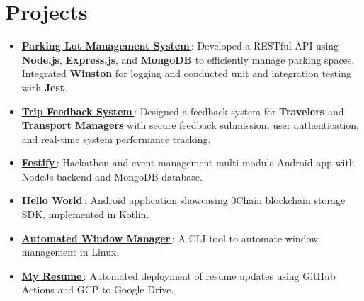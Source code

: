 \documentclass[letterpaper,1pt]{article}
\let\orighref\href
\renewcommand{\href}[2]{\orighref{#1}{#2\,\faExternalLink}}
\begin{document}
\section{Projects}
\begin{itemize}[leftmargin=*, itemsep=1pt, parsep=0pt]

  \item \href{https://github.com/yash10019coder/ParkingLotBackend}{\textbf{Parking Lot Management System}}: Developed a RESTful API using \textbf{Node.js}, \textbf{Express.js}, and \textbf{MongoDB} to efficiently manage parking spaces. Integrated \textbf{Winston} for logging and conducted unit and integration testing with \textbf{Jest}.
  \item \href{https://github.com/yash10019coder/TravelSpringBoot}{\textbf{Trip Feedback System}}: Designed a feedback system for \textbf{Travelers} and \textbf{Transport Managers} with secure feedback submission, user authentication, and real-time system performance tracking.
  \item \href{https://github.com/yash10019coder/festify-android}{\textbf{Festify}}: Hackathon and event management multi-module Android app with NodeJs backend and MongoDB database.
  \item \href{https://github.com/0chain/HelloWorld-Android}{\textbf{Hello World}}: Android application showcasing 0Chain blockchain storage SDK, implemented in Kotlin.
  \item \href{https://github.com/yash10019coder/AutomatedWindowManager}{\textbf{Automated Window Manager}}: A CLI tool to automate window management in Linux.
  \item \href{https://github.com/yash10019coder/resume}{\textbf{My Resume}}: Automated deployment of resume updates using GitHub Actions and GCP to Google Drive.

\end{itemize}
\end{document}
